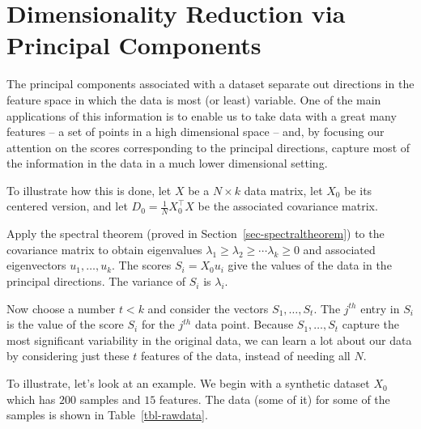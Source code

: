 \documentclass[
  11pt,
  letterpaper,
]{scrbook}
\theoremstyle{plain}
\theoremstyle{plain}
\theoremstyle{remark}
\begin{document}
\hypertarget{dimensionality-reduction-via-principal-components}{%
\section{Dimensionality Reduction via Principal
Components}\label{dimensionality-reduction-via-principal-components}}

The principal components associated with a dataset separate out
directions in the feature space in which the data is most (or least)
variable. One of the main applications of this information is to enable
us to take data with a great many features -- a set of points in a high
dimensional space -- and, by focusing our attention on the scores
corresponding to the principal directions, capture most of the
information in the data in a much lower dimensional setting.

To illustrate how this is done, let \(X\) be a \(N\times k\) data
matrix, let \(X_{0}\) be its centered version, and let
\(D_{0} = \frac{1}{N}X_{0}^{\intercal}X\) be the associated covariance
matrix.

Apply the spectral theorem (proved in Section~\ref{sec-spectraltheorem})
to the covariance matrix to obtain eigenvalues
\(\lambda_{1}\ge \lambda_{2}\ge\cdots \lambda_{k}\ge 0\) and associated
eigenvectors \(u_{1},\ldots, u_{k}\). The scores \(S_{i}=X_{0}u_{i}\)
give the values of the data in the principal directions. The variance of
\(S_{i}\) is \(\lambda_{i}\).

Now choose a number \(t<k\) and consider the vectors
\(S_{1},\ldots, S_{t}\). The \(j^{th}\) entry in \(S_{i}\) is the value
of the score \(S_{i}\) for the \(j^{th}\) data point. Because
\(S_{1},\ldots, S_{t}\) capture the most significant variability in the
original data, we can learn a lot about our data by considering just
these \(t\) features of the data, instead of needing all \(N\).

To illustrate, let's look at an example. We begin with a synthetic
dataset \(X_{0}\) which has \(200\) samples and \(15\) features. The
data (some of it) for some of the samples is shown in
Table~\ref{tbl-rawdata}.
\end{document}

